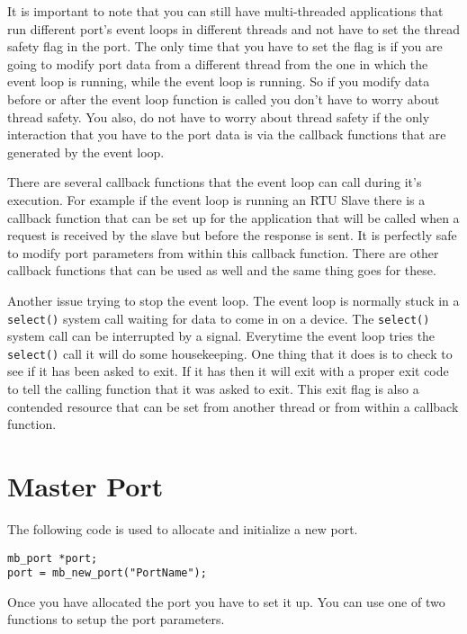 It is important to note that you can still have multi-threaded applications that run different port's event loops in different threads and not have to set the thread safety flag in the port.  The only time that you have to set the flag is if you are going to modify port data from a different thread from the one in which the event loop is running, while the event loop is running.  So if you modify data before or after the event loop function is called you don't have to worry about thread safety.  You also, do not have to worry about thread safety if the only interaction that you have to the port data is via the callback functions that are generated by the event loop.  

There are several callback functions that the event loop can call during it's execution.  For example if the event loop is running an RTU Slave there is a callback function that can be set up for the application that will be called when a request is received by the slave but before the response is sent.  It is perfectly safe to modify port parameters from within this callback function.  There are other callback functions that can be used as well and the same thing goes for these.  

Another issue trying to stop the event loop.  The event loop is normally stuck in a \texttt{select()} system call waiting for data to come in on a device.  The \texttt{select()} system call can be interrupted by a signal.  Everytime the event loop tries the \texttt{select()} call it will do some housekeeping.  One thing that it does is to check to see if it has been asked to exit.  If it has then it will exit with a proper exit code to tell the calling function that it was asked to exit.  This exit flag is also a contended resource that can be set from another thread or from within a callback function.


\chapter{Master Port}

The following code is used to allocate and initialize a new port.

\begin{verbatim}
mb_port *port;
port = mb_new_port("PortName");
\end{verbatim}

Once you have allocated the port you have to set it up. You can use one of two functions to setup the port parameters.


